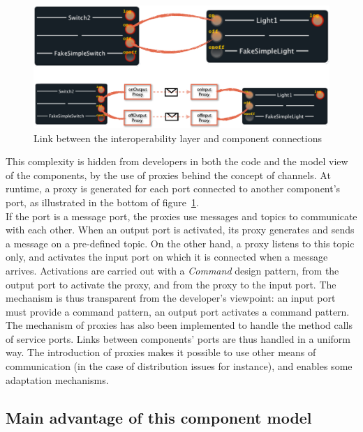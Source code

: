 \begin{figure}[h!]
\includegraphics[width=\textwidth]{part2/pics/InteropModelLink}
\caption{Link between the interoperability layer and component connections}
\label{fig:linkWithInteropLayer}
\end{figure}

This complexity is hidden from developers in both the code and the model view of the components, by the use of proxies behind the concept of channels. At runtime, a proxy is generated for each port connected to another component's port, as illustrated in the bottom of figure~\ref{fig:linkWithInteropLayer}.\\
If the port is a message port, the proxies use messages and topics to communicate with each other. When an output port is activated, its proxy generates and sends a message on a pre-defined topic. On the other hand, a proxy listens to this topic only, and activates the input port on which it is connected when a message arrives. Activations are carried out with a {\it Command} design pattern, from the output port to activate the proxy, and from the proxy to the input port. The mechanism is thus transparent from the developer's viewpoint: an input port must provide a command pattern, an output port activates a command pattern.\\

The mechanism of proxies has also been implemented to handle the method calls of service ports. Links between components' ports are thus handled in a uniform way. The introduction of proxies makes it possible to use other means of communication (in the case of distribution issues for instance), and enables some adaptation mechanisms.\\

\subsection{Main advantage of this component model}

